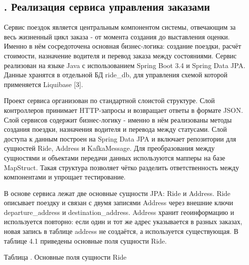 \setcounter{chaptercntr}{3}


\titlespace

\subsection*{
  \gostTitleFont
  \redline
  \thechaptercntr .\thesubchaptercntr \spc
  Реализация сервиса управления заказами
} \addtocounter{subchaptercntr}{1}

\subtitlespace

{\gostFont

  \par \redline Сервис поездок является центральным компонентом системы, отвечающим за весь жизненный цикл заказа - от момента создания до выставления оценки. Именно в нём сосредоточена основная бизнес-логика: создание поездки, расчёт стоимости, назначение водителя и перевод заказа между состояниями. Сервис реализован на языке Java с использованием Spring Boot 3.4 и Spring Data JPA. Данные хранятся в отдельной БД ride\_db, для управления схемой которой применяется Liquibase [3].

  \par \redline Проект сервиса организован по стандартной слоистой структуре. Слой контроллеров принимает HTTP-запросы и возвращает ответы в формате JSON. Слой сервисов содержит бизнес-логику - именно в нём реализованы методы создания поездки, назначения водителя и перевода между статусами. Слой доступа к данным построен на Spring Data JPA и включает репозитории для сущностей Ride, Address и KafkaMessage. Для преобразования между сущностями и объектами передачи данных используются мапперы на базе MapStruct. Такая структура позволяет чётко разделить ответственность между компонентами и упрощает тестирование.

  \par \redline В основе сервиса лежат две основные сущности JPA: Ride и Address. Ride описывает поездку и связан с двумя записями Address через внешние ключи departure\_address и destination\_address. Address хранит геоинформацию и используется повторно: если один и тот же адрес указывается в разных заказах, новая запись в таблице address не создаётся, а используется существующая. В таблице 4.1 приведены основные поля сущности Ride.

  \topTablespace
  {\begin{Center}
      \par Таблица \thechaptercntr .\thetablecntr \spc {--} Основные поля сущности Ride


\end{Center}}}
